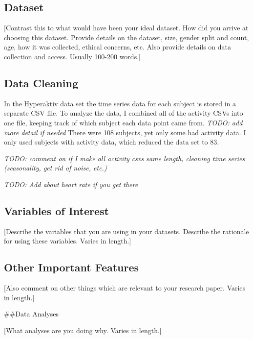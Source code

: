 \documentclass[,article,submit,moreauthors,pdftex]{mdpi}
\begin{document}
\hypertarget{dataset}{%
\subsection{Dataset}\label{dataset}}

{[}Contrast this to what would have been your ideal dataset. How did you
arrive at choosing this dataset. Provide details on the dataset, size,
gender split and count, age, how it was collected, ethical concerns,
etc. Also provide details on data collection and access. Usually 100-200
words.{]}

\hypertarget{data-cleaning}{%
\subsection{Data Cleaning}\label{data-cleaning}}

In the Hyperaktiv data set the time series data for each subject is
stored in a separate CSV file. To analyze the data, I combined all of
the activity CSVs into one file, keeping track of which subject each
data point came from. \emph{TODO: add more detail if needed} There were
108 subjects, yet only some had activity data. I only used subjects with
activity data, which reduced the data set to 83.

\emph{TODO: comment on if I make all activity csvs same length, cleaning
time series (seasonality, get rid of noise, etc.)}

\emph{TODO: Add about heart rate if you get there}

\hypertarget{variables-of-interest}{%
\subsection{Variables of Interest}\label{variables-of-interest}}

{[}Describe the variables that you are using in your datasets. Describe
the rationale for using these variables. Varies in length.{]}

\hypertarget{other-important-features}{%
\subsection{Other Important Features}\label{other-important-features}}

{[}Also comment on other things which are relevant to your research
paper. Varies in length.{]}

\#\#Data Analyses

{[}What analyses are you doing why. Varies in length.{]}
\end{document}
